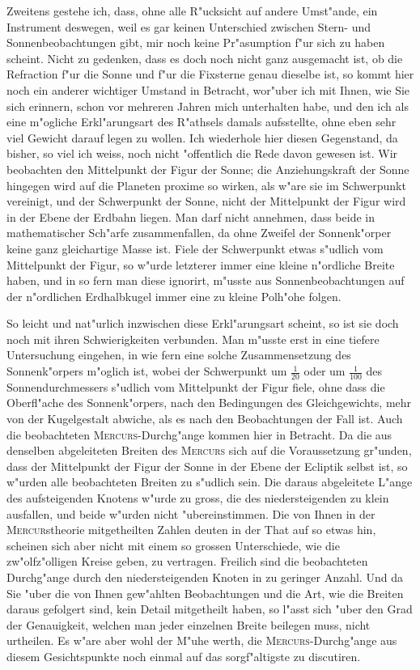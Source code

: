 \documentclass[12pt,a4paper]{article}
\begin{document}
Zweitens gestehe ich, dass, ohne alle R"ucksicht auf andere Umst"ande, ein Instrument deswegen,
weil es gar keinen Unterschied zwischen Stern- und Sonnenbeobachtungen gibt, mir noch keine Pr"asumption
f"ur sich zu haben scheint. Nicht zu gedenken, dass es doch noch nicht ganz ausgemacht ist,
ob die Refraction f"ur die Sonne und f"ur die Fixsterne genau dieselbe ist, so kommt hier noch ein
anderer wichtiger Umstand in Betracht, wor"uber ich mit Ihnen, wie Sie sich erinnern, schon vor mehreren
Jahren mich unterhalten habe, und den ich als eine m"ogliche Erkl"arungsart des R"athsels damals
aufsstellte, ohne eben sehr viel Gewicht darauf legen zu wollen. Ich wiederhole hier diesen Gegenstand,
da bisher, so viel ich weiss, noch nicht "offentlich die Rede davon gewesen ist. Wir beobachten den
Mittelpunkt der Figur der Sonne; die Anziehungskraft der Sonne hingegen wird auf die Planeten
proxime so wirken, als w"are sie im Schwerpunkt vereinigt, und der Schwerpunkt der Sonne, nicht der
Mittelpunkt der Figur wird in der Ebene der Erdbahn liegen. Man darf nicht annehmen, dass beide
in mathematischer Sch"arfe zusammenfallen, da ohne Zweifel der Sonnenk"orper keine ganz gleichartige
Masse ist. Fiele der Schwerpunkt etwas s"udlich vom Mittelpunkt der Figur, so w"urde letzterer immer
eine kleine n"ordliche Breite haben, und in so fern man diese ignorirt, m"usste aus Sonnenbeobachtungen
auf der n"ordlichen Erdhalbkugel immer eine zu kleine Polh"ohe folgen.

\newpage

So leicht und nat"urlich inzwischen diese Erkl"arungsart scheint, so ist sie doch noch mit ihren
Schwierigkeiten verbunden. Man m"usste erst in eine tiefere Untersuchung eingehen, in wie fern eine
solche Zusammensetzung des Sonnenk"orpers m"oglich ist, wobei der Schwerpunkt um $\frac{1}{20}$ oder um
$\frac{1}{100}$ des Sonnendurchmessers s"udlich vom Mittelpunkt der Figur fiele, ohne dass die Oberfl"ache des
Sonnenk"orpers, nach den Bedingungen des Gleichgewichts, mehr von der Kugelgestalt abwiche, als es
nach den Beobachtungen der Fall ist. Auch die beobachteten \textsc{Mercurs}-Durchg"ange kommen hier in
Betracht. Da die aus denselben abgeleiteten Breiten des \textsc{Mercurs} sich auf die Voraussetzung gr"unden,
dass der Mittelpunkt der Figur der Sonne in der Ebene der Ecliptik selbst ist, so w"urden alle
beobachteten Breiten zu s"udlich sein. Die daraus abgeleitete L"ange des aufsteigenden Knotens w"urde zu gross,
die des niedersteigenden zu klein ausfallen, und beide w"urden nicht "ubereinstimmen. Die von Ihnen in der
\textsc{Mercur}stheorie mitgetheilten Zahlen deuten in der That auf so etwas hin, scheinen sich aber nicht mit einem
so grossen Unterschiede, wie die zw"olfz"olligen Kreise geben, zu vertragen. Freilich sind die beobachteten
Durchg"ange durch den niedersteigenden Knoten in zu geringer Anzahl. Und da Sie "uber die von Ihnen
gew"ahlten Beobachtungen und die Art, wie die Breiten daraus gefolgert sind, kein Detail mitgetheilt haben,
so l"asst sich "uber den Grad der Genauigkeit, welchen man jeder einzelnen Breite beilegen muss, nicht
urtheilen. Es w"are aber wohl der M"uhe werth, die \textsc{Mercurs}-Durchg"ange aus diesem Gesichtspunkte
noch einmal auf das sorgf"altigste zu discutiren.
\end{document}
